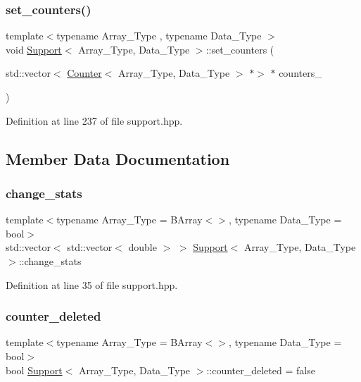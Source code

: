 \subsubsection{\texorpdfstring{set\+\_\+counters()}{set\_counters()}}
{\footnotesize\ttfamily template$<$typename Array\+\_\+\+Type , typename Data\+\_\+\+Type $>$ \\
void \hyperlink{class_support}{Support}$<$ Array\+\_\+\+Type, Data\+\_\+\+Type $>$\+::set\+\_\+counters (\begin{DoxyParamCaption}\item[{std\+::vector$<$ \hyperlink{class_counter}{Counter}$<$ Array\+\_\+\+Type, Data\+\_\+\+Type $>$ $\ast$$>$ $\ast$}]{counters\+\_\+ }\end{DoxyParamCaption})\hspace{0.3cm}{\ttfamily [inline]}}



Definition at line 237 of file support.\+hpp.



\subsection{Member Data Documentation}
\mbox{\label{class_support_ae6e6f53f963c1be75bea0ee9896d1afe}} 
\subsubsection{\texorpdfstring{change\+\_\+stats}{change\_stats}}
{\footnotesize\ttfamily template$<$typename Array\+\_\+\+Type = B\+Array$<$$>$, typename Data\+\_\+\+Type = bool$>$ \\
std\+::vector$<$ std\+::vector$<$ double $>$ $>$ \hyperlink{class_support}{Support}$<$ Array\+\_\+\+Type, Data\+\_\+\+Type $>$\+::change\+\_\+stats}



Definition at line 35 of file support.\+hpp.

\mbox{\label{class_support_acb3f9a11e2c64bdea950174f7c133536}} 
\subsubsection{\texorpdfstring{counter\+\_\+deleted}{counter\_deleted}}
{\footnotesize\ttfamily template$<$typename Array\+\_\+\+Type = B\+Array$<$$>$, typename Data\+\_\+\+Type = bool$>$ \\
bool \hyperlink{class_support}{Support}$<$ Array\+\_\+\+Type, Data\+\_\+\+Type $>$\+::counter\+\_\+deleted = false}



